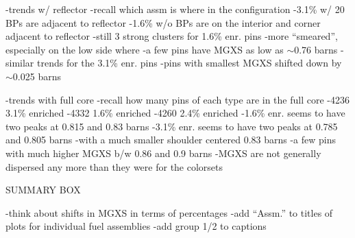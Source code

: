 -trends w/ reflector
  -recall which assm is where in the configuration
    -3.1\% w/ 20 \acp{BP} are adjacent to reflector
    -1.6\% w/o \acp{BP} are on the interior and corner adjacent to reflector
  -still 3 strong clusters for 1.6\% enr. pins
    -more ``smeared'', especially on the low side where
    -a few pins have \ac{MGXS} as low as $\sim$0.76 barns
  -similar trends for the 3.1\% enr. pins
    -pins with smallest \ac{MGXS} shifted down by $\sim$0.025 barns
  
-trends with full core
  -recall how many pins of each type are in the full core
    -4236 3.1\% enriched
    -4332 1.6\% enriched
    -4260 2.4\% enriched
  -1.6\% enr. seems to have two peaks at 0.815 and 0.83 barns
  -3.1\% enr. seems to have two peaks at 0.785 and 0.805 barns
    -with a much smaller shoulder centered 0.83 barns
    -a few pins with much higher \ac{MGXS} b/w 0.86 and 0.9 barns
  -\ac{MGXS} are not generally dispersed any more than they were for the colorsets
  

SUMMARY BOX

-think about shifts in \ac{MGXS} in terms of percentages
-add ``Assm.'' to titles of plots for individual fuel assemblies
-add group 1/2 to captions

